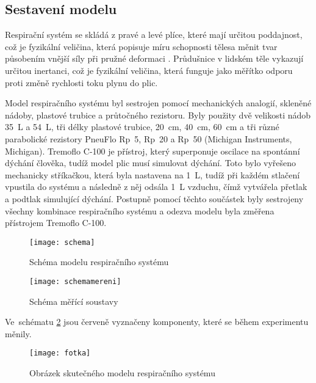 \subsection{Sestavení modelu}
Respirační systém se skládá z pravé a levé plíce, které mají určitou poddajnost, což je fyzikální veličina, která popisuje míru schopnosti tělesa měnit tvar působením vnější síly při pružné deformaci \cite{Poddajnost}. Průdušnice v lidském těle vykazují určitou inertanci, což je fyzikální veličina, která funguje jako měřítko odporu proti změně rychlosti toku plynu do plic\cite{Inertance}. 

 Model respiračního systému  byl sestrojen pomocí mechanických analogií, skleněné nádoby, plastové trubice a průtočného rezistoru. Byly použity dvě velikosti nádob \SI{35}{L} a \SI{54}{L}, tři délky plastové trubice, \SI{20}{cm},  \SI{40}{cm},  \SI{60}{cm}  a tři různé parabolické rezistory PneuFlo Rp~5, Rp~20 a Rp~50 (Michigan Instruments, Michigan). 
Tremoflo C-100 je přístroj, který superponuje oscilace na spontánní dýchání člověka, tudíž model plic musí simulovat dýchání. Toto bylo vyřešeno mechanicky stříkačkou, která byla nastavena na  \SI{1}{L}, tudíž při každém stlačení vpustila  do systému a následně z něj odsála \SI{1}{L} vzduchu, čímž vytvářela přetlak a podtlak simulující dýchání.  
Postupně pomocí těchto součástek byly sestrojeny všechny kombinace respiračního systému a odezva modelu byla změřena přístrojem Tremoflo C-100.

\begin{figure}[p]
			\centering
 			\texttt{[image: schema]}
			\caption{Schéma modelu respiračního systému}
			 \label{obrazekschema}
 \end{figure}

\begin{figure}[p]
			\centering
 			\texttt{[image: schemamereni]}
			\caption{Schéma měřící soustavy}
			 \label{obrazekschemamereni}
 \end{figure}

Ve~schématu \ref{obrazekschemamereni} jsou červeně vyznačeny komponenty, které se během experimentu měnily.

\begin{figure}[p]
			\centering
 			\texttt{[image: fotka]}
			\caption{Obrázek skutečného modelu respiračního systému}
			 \label{obrazekreal}
 \end{figure}

\clearpage

